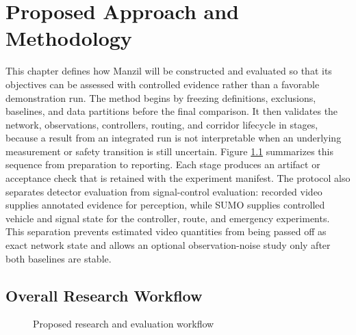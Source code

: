 \chapter{Proposed Approach and Methodology}
\label{ch:method}

This chapter defines how Manzil will be constructed and evaluated so that its objectives can be assessed with controlled evidence rather than a favorable demonstration run. The method begins by freezing definitions, exclusions, baselines, and data partitions before the final comparison. It then validates the network, observations, controllers, routing, and corridor lifecycle in stages, because a result from an integrated run is not interpretable when an underlying measurement or safety transition is still uncertain. Figure \ref{fig:method-workflow} summarizes this sequence from preparation to reporting. Each stage produces an artifact or acceptance check that is retained with the experiment manifest. The protocol also separates detector evaluation from signal-control evaluation: recorded video supplies annotated evidence for perception, while SUMO supplies controlled vehicle and signal state for the controller, route, and emergency experiments. This separation prevents estimated video quantities from being passed off as exact network state and allows an optional observation-noise study only after both baselines are stable.

\section{Overall Research Workflow}

\begin{figure}[htbp]
\centering
{}
\caption{Proposed research and evaluation workflow}
\label{fig:method-workflow}
\end{figure}

